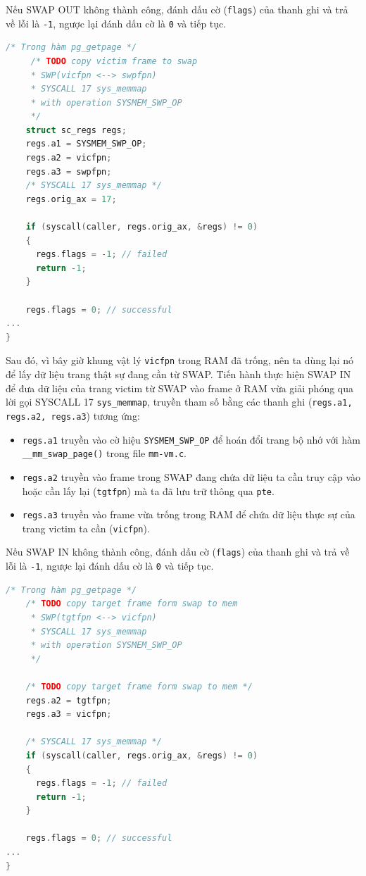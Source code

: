Nếu SWAP OUT không thành công, đánh dấu cờ (\texttt{flags}) của thanh ghi và trả về lỗi là \texttt{-1}, ngược lại đánh dấu cờ là \texttt{0} và tiếp tục.

\begin{lstlisting}[style=Cstyle,language=C]
/* Trong hàm pg_getpage */
     /* TODO copy victim frame to swap
     * SWP(vicfpn <--> swpfpn)
     * SYSCALL 17 sys_memmap
     * with operation SYSMEM_SWP_OP
     */
    struct sc_regs regs;
    regs.a1 = SYSMEM_SWP_OP;
    regs.a2 = vicfpn;
    regs.a3 = swpfpn;
    /* SYSCALL 17 sys_memmap */
    regs.orig_ax = 17;

    if (syscall(caller, regs.orig_ax, &regs) != 0)
    {
      regs.flags = -1; // failed
      return -1;
    }

    regs.flags = 0; // successful
...
}
\end{lstlisting} 

Sau đó, vì bây giờ khung vật lý \texttt{vicfpn} trong RAM đã trống, nên ta dùng lại nó để lấy dữ liệu trang thật sự đang cần từ SWAP. Tiến hành thực hiện SWAP IN để đưa dữ liệu của trang victim từ SWAP vào frame ở RAM vừa giải phóng qua lời gọi SYSCALL 17 \texttt{sys\_memmap}, truyền tham số bằng các thanh ghi (\texttt{regs.a1, regs.a2, regs.a3}) tương ứng: 

\begin{itemize}
    \item \texttt{regs.a1} truyền vào cờ hiệu \texttt{SYSMEM\_SWP\_OP} để hoán đổi trang bộ nhớ với hàm \texttt{\_\_mm\_swap\_page()} trong file \texttt{mm-vm.c}.
    \item \texttt{regs.a2} truyền vào frame trong SWAP đang chứa dữ liệu ta cần truy cập vào hoặc cần lấy lại (\texttt{tgtfpn}) mà ta đã lưu trữ thông qua \texttt{pte}.
    \item \texttt{regs.a3} truyền vào frame vừa trống trong RAM để chứa dữ liệu thực sự của trang victim ta cần (\texttt{vicfpn}).
\end{itemize}

Nếu SWAP IN không thành công, đánh dấu cờ (\texttt{flags}) của thanh ghi và trả về lỗi là \texttt{-1}, ngược lại đánh dấu cờ là \texttt{0} và tiếp tục.

\begin{lstlisting}[style=Cstyle,language=C]
/* Trong hàm pg_getpage */
    /* TODO copy target frame form swap to mem
     * SWP(tgtfpn <--> vicfpn)
     * SYSCALL 17 sys_memmap
     * with operation SYSMEM_SWP_OP
     */

    /* TODO copy target frame form swap to mem */
    regs.a2 = tgtfpn; 
    regs.a3 = vicfpn; 

    /* SYSCALL 17 sys_memmap */
    if (syscall(caller, regs.orig_ax, &regs) != 0)
    {
      regs.flags = -1; // failed
      return -1;
    }

    regs.flags = 0; // successful
...
}
\end{lstlisting}

